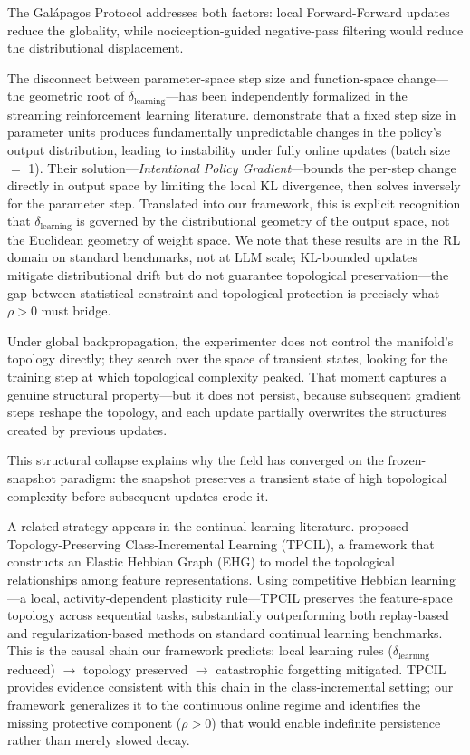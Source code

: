 \documentclass{article}
\begin{document}
The Gal\'apagos Protocol addresses both factors: local Forward-Forward updates reduce the globality, while nociception-guided negative-pass filtering would reduce the distributional displacement.

The disconnect between parameter-space step size and function-space change---the geometric root of $\delta_{\text{learning}}$---has been independently formalized in the streaming reinforcement learning literature. \citet{Sharifnassab2026intentional} demonstrate that a fixed step size in parameter units produces fundamentally unpredictable changes in the policy's output distribution, leading to instability under fully online updates (batch size $=$ 1). Their solution---\emph{Intentional Policy Gradient}---bounds the per-step change directly in output space by limiting the local KL divergence, then solves inversely for the parameter step. Translated into our framework, this is explicit recognition that $\delta_{\text{learning}}$ is governed by the distributional geometry of the output space, not the Euclidean geometry of weight space. We note that these results are in the RL domain on standard benchmarks, not at LLM scale; KL-bounded updates mitigate distributional drift but do not guarantee topological preservation---the gap between statistical constraint and topological protection is precisely what $\rho > 0$ must bridge.

Under global backpropagation, the experimenter does not control the manifold's topology directly; they search over the space of transient states, looking for the training step at which topological complexity peaked. That moment captures a genuine structural property---but it does not persist, because subsequent gradient steps reshape the topology, and each update partially overwrites the structures created by previous updates.

This structural collapse explains why the field has converged on the frozen-snapshot paradigm: the snapshot preserves a transient state of high topological complexity before subsequent updates erode it.

A related strategy appears in the continual-learning literature. \citet{Tao2020topology} proposed Topology-Preserving Class-Incremental Learning (TPCIL), a framework that constructs an Elastic Hebbian Graph (EHG) to model the topological relationships among feature representations. Using competitive Hebbian learning---a local, activity-dependent plasticity rule---TPCIL preserves the feature-space topology across sequential tasks, substantially outperforming both replay-based and regularization-based methods on standard continual learning benchmarks. This is the causal chain our framework predicts: local learning rules ($\delta_{\text{learning}}$ reduced) $\to$ topology preserved $\to$ catastrophic forgetting mitigated. TPCIL provides evidence consistent with this chain in the class-incremental setting; our framework generalizes it to the continuous online regime and identifies the missing protective component ($\rho > 0$) that would enable indefinite persistence rather than merely slowed decay.
\end{document}
